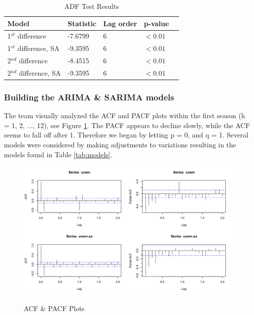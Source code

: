 {	 \begin{table}[H]
		 \centering
		 \caption{ADF Test Results}
		 \label{tab:ADF}
		 \begin{tabular}{lllll}
		 \hline
		 \textbf{Model} & \textbf{Statistic} & \textbf{Lag order} & \textbf{p-value}\\ \hline
		 1\(^{st}\) difference &  -7.6799 & 6 & \( < 0.01\)\\
		  1\(^{st}\) difference, SA &  -9.3595 & 6 &\( < 0.01\)\\
		 2\(^{nd}\) difference &  -8.4515 & 6 & \( < 0.01\)\\
		  2\(^{nd}\) difference, SA &  -9.3595 & 6 & \( < 0.01\)\\		 \hline
		 \end{tabular}
		 \end{table}

  
  \subsubsection*{Building the ARIMA \& SARIMA models}
  The team visually analyzed the ACF and PACF plots within the first season (h = 1, 2, ..., 12), see Figure \ref{fig:secdiff2}. The PACF appears to decline slowly, while the ACF seems to fall off after 1. Therefore we began by letting p = 0, and q = 1. Several models were considered by making adjustments to variations resulting in the models found in Table \ref{tab:models}.\newline
  
   \begin{figure}[H]
      	\centering
      	\caption{ACF \& PACF Plots}
      	\includegraphics[width=\linewidth]{images/acfpacf}
      	\label{fig:secdiff2}
      \end{figure}
  
}
